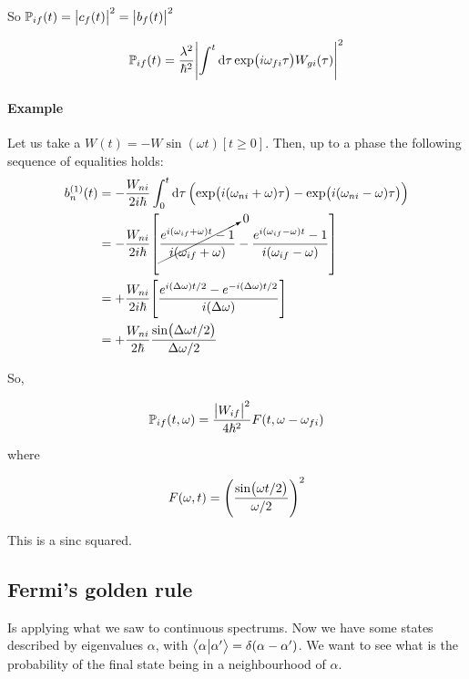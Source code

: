 \documentclass[main.tex]{subfiles}
\begin{document}
So \(\mathbb{P} _{if}(t) = \abs{c_f(t)}^2 = \abs{b_f(t)}^2\)

\begin{equation}
    \P _{if}(t) = \frac{\lambda^2}{\hbar^2} \abs{\int   ^{t} \dd{\tau} \exp(i \omega_{fi} \tau)W_{gi}(\tau)  }^2
\end{equation}

\paragraph{Example}

Let us take a \(W(t) = - W \sin(\omega t) [t \geq 0]\). Then, up to a phase the following sequence of equalities holds:
\begin{subequations}
\begin{align}
    b_n^{(1)}(t) &= - \frac{W_{ni}}{2 i\hbar} \int _{0}   ^{t} \dd{\tau} \qty(\exp(i (\omega_{ni} + \omega) \tau) - \exp(i (\omega_{ni} - \omega) \tau))  \\
    &= -\frac{W_{ni}}{2i \hbar} \qty[
        \cancelto{0}{
        \frac{e^{i (\omega_{if} + \omega) t} - 1}{i (\omega_{if} + \omega)}} -
        \frac{e^{i (\omega_{if} - \omega) t} - 1}{i (\omega_{if} - \omega)}
    ]  \\
    &= +\frac{W_{ni}}{2 i\hbar} \qty[
        \frac{e^{i (\Delta \omega) t/2} - e^{-i (\Delta \omega) t/2}}{i (\Delta \omega)}
        ]  \\
    &= +\frac{W_{ni}}{2\hbar}
        \frac{\sin(\Delta \omega t/2)}{\Delta \omega /2}
\end{align}
\end{subequations}


So,

\begin{equation} \label{eq:timedep-perturbation-probability-sin}
    \P _{if} (t, \omega) = \frac{\abs{W_{if}}^2 }{4 \hbar^2} F(t, \omega - \omega_{fi})
\end{equation}

where

\begin{equation}
    F(\omega, t) = \qty(\frac{\sin(\omega t/2)}{\omega/2})^2
\end{equation}

This is a sinc squared.

\subsection{Fermi's golden rule}

Is applying what we saw to continuous spectrums. Now we have some
states described by eigenvalues \(\alpha\), with
 \(\braket{\alpha}{\alpha'} = \delta(\alpha - \alpha') \). We want to see what is the probability of the final state being in a neighbourhood of \(\alpha\).
\end{document}
